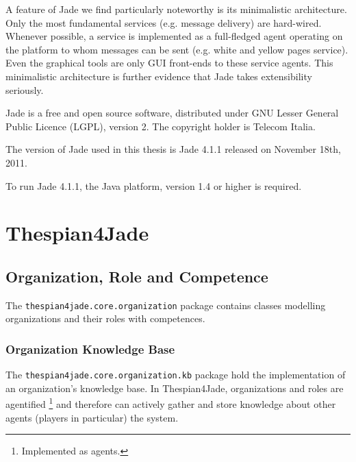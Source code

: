 A feature of Jade we find particularly noteworthy is its minimalistic architecture.
Only the most fundamental services (e.g. message delivery) are hard-wired.
Whenever possible, a service is implemented as a full-fledged agent operating on the platform to whom messages can be sent (e.g. white and yellow pages service).
Even the graphical tools are only GUI front-ends to these service agents.
This minimalistic architecture is further evidence that Jade takes extensibility seriously.

Jade is a free and open source software, distributed under GNU Lesser General Public Licence (LGPL), version 2.
The copyright holder is Telecom Italia.

The version of Jade used in this thesis is Jade 4.1.1 released on November 18th, 2011.

To run Jade 4.1.1, the Java platform, version 1.4 or higher is required.

\section{Thespian4Jade}

\subsection{Organization, Role and Competence}

The \texttt{thespian4jade.core.organization} package contains classes modelling organizations and their roles with competences.



\subsubsection{Organization Knowledge Base}

The \texttt{thespian4jade.core.organization.kb} package hold the implementation of an organization's knowledge base.
In Thespian4Jade, organizations and roles are agentified
\footnote{Implemented as agents.}
and therefore can actively gather and store knowledge about other agents (players in particular) the system.

